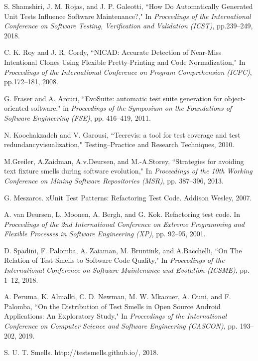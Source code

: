 \documentclass[conference]{IEEEtran}
\begin{document}
\begin{thebibliography}{15}
 S. Shamshiri, J. M. Rojas, and J. P. Galeotti, ``How Do Automatically Generated Unit Tests Influence Software Maintenance?," In {\it Proceedings of the International Conference on Software Testing, Verification and Validation (ICST)}, pp.239--249, 2018. 

 C. K. Roy and J. R. Cordy, ``NICAD: Accurate Detection of Near-Miss Intentional Clones Using Flexible Pretty-Printing and Code Normalization," In {\it Proceedings of the International Conference on Program Comprehension (ICPC)}, pp.172--181, 2008.

 G. Fraser and A. Arcuri, ``EvoSuite: automatic test suite generation for object-oriented software," in  {\it Proceedings of the Symposium on the Foundations of Software Engineering (FSE)}, pp. 416--419, 2011.

 N. Koochakzadeh and V. Garousi, ``Tecrevis: a tool for test coverage and test redundancyvisualization," Testing–Practice and Research Techniques, 2010.

 M.Greiler, A.Zaidman, A.v.Deursen, and M.-A.Storey, ``Strategies for avoiding text fixture smells during software evolution," In {\it Proceedings of the 10th Working Conference on Mining Software Repositories (MSR)}, pp. 387--396, 2013.

 G. Meszaros. xUnit Test Patterns: Refactoring Test Code. Addison Wesley, 2007.

 A. van Deursen, L. Moonen, A. Bergh, and G. Kok. Refactoring test code. In {\it Proceedings of the 2nd International Conference on Extreme Programming and Flexible Processes in Software Engineering (XP)}, pp. 92--95, 2001.

 D. Spadini, F. Palomba, A. Zaiaman, M. Bruntink, and A.Bacchelli, ``On The Relation of Test Smells to Software Code Quality," In {\it Proceedings of the International Conference on Software Maintenance and Evolution (ICSME)}, pp. 1--12, 2018. 

 A. Peruma, K. Almalki, C. D. Newman, M. W. Mkaouer, A. Ouni, and F. Palomba, ``On the Distribution of Test Smells in Open Source Android Applications: An Exploratory Study," In {\it Proceedings of the International Conference on Computer Science and Software Engineering (CASCON)}, pp. 193--202, 2019.

 S. U. T. Smells. http://testsmells.github.io/, 2018.


\end{thebibliography}
\end{document}
